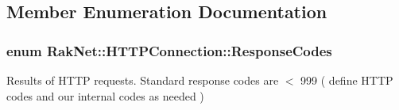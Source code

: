 \subsection{Member Enumeration Documentation}
\hypertarget{class_rak_net_1_1_h_t_t_p_connection_a476dfc8417c5ba51f29bcebf24f1685e}{
\subsubsection[{Response\-Codes}]{\setlength{\rightskip}{0pt plus 5cm}enum {\bf Rak\-Net\-::\-H\-T\-T\-P\-Connection\-::\-Response\-Codes}}}\label{class_rak_net_1_1_h_t_t_p_connection_a476dfc8417c5ba51f29bcebf24f1685e}
Results of H\-T\-T\-P requests. Standard response codes are $<$ 999 ( define H\-T\-T\-P codes and our internal codes as needed ) 

